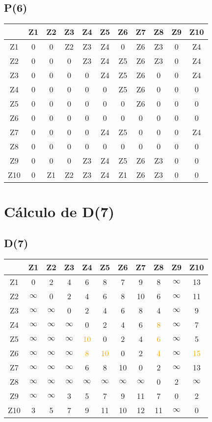 \documentclass[a4paper,11pt]{article}
\begin{document}
\subsection*{P(6)}
\begin{center}
\begin{tabular}{c|cccccccccc}
 & Z1 & Z2 & Z3 & Z4 & Z5 & Z6 & Z7 & Z8 & Z9 & Z10 \\ \hline
Z1 & 0 & 0 & Z2 & Z3 & Z4 & 0 & Z6 & Z3 & 0 & Z4 \\
Z2 & 0 & 0 & 0 & Z3 & Z4 & Z5 & Z6 & Z3 & 0 & Z4 \\
Z3 & 0 & 0 & 0 & 0 & Z4 & Z5 & Z6 & 0 & 0 & Z4 \\
Z4 & 0 & 0 & 0 & 0 & 0 & Z5 & Z6 & 0 & 0 & 0 \\
Z5 & 0 & 0 & 0 & 0 & 0 & 0 & Z6 & 0 & 0 & 0 \\
Z6 & 0 & 0 & 0 & 0 & 0 & 0 & 0 & 0 & 0 & 0 \\
Z7 & 0 & 0 & 0 & 0 & Z4 & Z5 & 0 & 0 & 0 & Z4 \\
Z8 & 0 & 0 & 0 & 0 & 0 & 0 & 0 & 0 & 0 & 0 \\
Z9 & 0 & 0 & 0 & Z3 & Z4 & Z5 & Z6 & Z3 & 0 & 0 \\
Z10 & 0 & Z1 & Z2 & Z3 & Z4 & Z1 & Z6 & Z3 & 0 & 0 \\
\end{tabular}
\end{center}
\newpage
\section*{Cálculo de D(7)}
\subsection*{D(7)}
\begin{center}
\begin{tabular}{c|cccccccccc}
 & Z1 & Z2 & Z3 & Z4 & Z5 & Z6 & Z7 & Z8 & Z9 & Z10 \\ \hline
Z1 & 0 & 2 & 4 & 6 & 8 & 7 & 9 & 8 & $\infty$ & 13 \\
Z2 & $\infty$ & 0 & 2 & 4 & 6 & 8 & 10 & 6 & $\infty$ & 11 \\
Z3 & $\infty$ & $\infty$ & 0 & 2 & 4 & 6 & 8 & 4 & $\infty$ & 9 \\
Z4 & $\infty$ & $\infty$ & $\infty$ & 0 & 2 & 4 & 6 & \textcolor{orange}{8} & $\infty$ & 7 \\
Z5 & $\infty$ & $\infty$ & $\infty$ & \textcolor{orange}{10} & 0 & 2 & 4 & \textcolor{orange}{6} & $\infty$ & 5 \\
Z6 & $\infty$ & $\infty$ & $\infty$ & \textcolor{orange}{8} & \textcolor{orange}{10} & 0 & 2 & \textcolor{orange}{4} & $\infty$ & \textcolor{orange}{15} \\
Z7 & $\infty$ & $\infty$ & $\infty$ & 6 & 8 & 10 & 0 & 2 & $\infty$ & 13 \\
Z8 & $\infty$ & $\infty$ & $\infty$ & $\infty$ & $\infty$ & $\infty$ & $\infty$ & 0 & 2 & $\infty$ \\
Z9 & $\infty$ & $\infty$ & 3 & 5 & 7 & 9 & 11 & 7 & 0 & 2 \\
Z10 & 3 & 5 & 7 & 9 & 11 & 10 & 12 & 11 & $\infty$ & 0 \\
\end{tabular}
\end{center}
\end{document}
